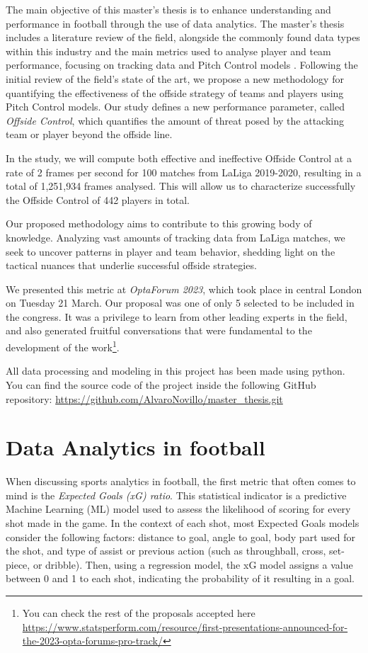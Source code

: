 \documentclass[
  10pt,
  twoside,nohyper]{book}
\begin{document}
The main objective of this master's thesis is to enhance understanding and performance in football through the use of data analytics. The master's thesis includes a literature review of the field, alongside the commonly found data types within this industry and the main metrics used to analyse player and team performance, focusing on tracking data and Pitch Control models \autocite{Spearman}. Following the initial review of the field's state of the art, we propose a new methodology for quantifying the effectiveness of the offside strategy of teams and players using Pitch Control models. Our study defines a new performance parameter, called \emph{Offside Control}, which quantifies the amount of threat posed by the attacking team or player beyond the offside line.

In the study, we will compute both effective and ineffective Offside Control at a rate of 2 frames per second for 100 matches from LaLiga 2019-2020, resulting in a total of 1,251,934 frames analysed. This will allow us to characterize successfully the Offside Control of 442 players in total.

Our proposed methodology aims to contribute to this growing body of knowledge. Analyzing vast amounts of tracking data from LaLiga matches, we seek to uncover patterns in player and team behavior, shedding light on the tactical nuances that underlie successful offside strategies.

We presented this metric at \emph{OptaForum 2023}, which took place in central London on Tuesday 21 March. Our proposal was one of only 5 selected to be included in the congress. It was a privilege to learn from other leading experts in the field, and also generated fruitful conversations that were fundamental to the development of the work\footnote{You can check the rest of the proposals accepted here \url{https://www.statsperform.com/resource/first-presentations-announced-for-the-2023-opta-forums-pro-track/}}.

All data processing and modeling in this project has been made using python. You can find the source code of the project inside the following GitHub repository: \url{https://github.com/AlvaroNovillo/master_thesis.git}

\chapter{Data Analytics in football}\label{data-analytics-in-football}

When discussing sports analytics in football, the first metric that
often comes to mind is the \emph{Expected Goals (xG) ratio}. This statistical indicator is a predictive Machine Learning (ML) model used to assess the likelihood of scoring for every shot made in the game. In the context of each shot, most Expected Goals models consider the following factors: distance to goal, angle to goal, body part used for the shot, and type of assist or previous action (such as throughball, cross, set-piece, or dribble). Then, using a regression model, the xG model assigns a value between 0 and 1 to each shot, indicating the probability of it resulting in a goal.
\end{document}
